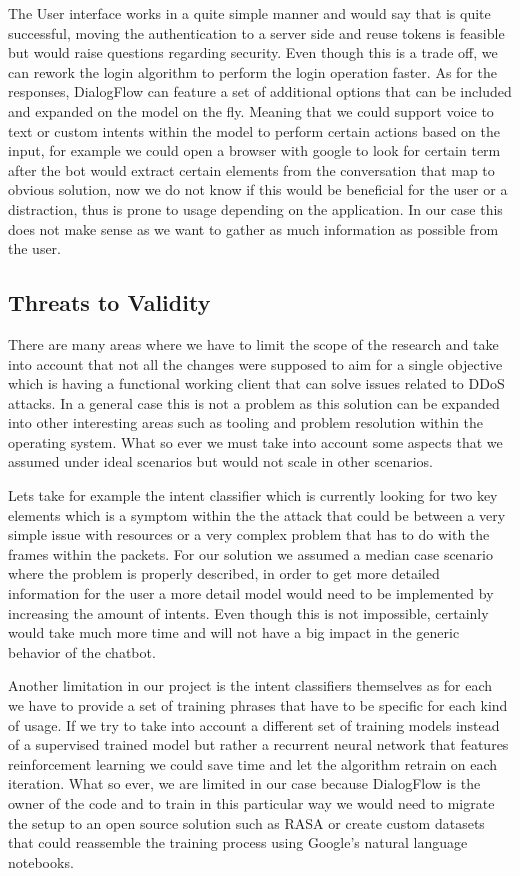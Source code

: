 The User interface works in a quite simple manner and would say that is quite successful, moving the authentication to a server side and reuse tokens is feasible but would raise questions regarding security. Even though this is a trade off, we can rework the login algorithm to perform the login operation faster. As for the responses, DialogFlow can feature a set of additional options that can be included and expanded on the model on the fly. Meaning that we could support voice to text or custom intents within the model to perform certain actions based on the input, for example we could open a browser with google to look for certain term after the bot would extract certain elements from the conversation that map to obvious solution, now we do not know if this would be beneficial for the user or a distraction, thus is prone to usage depending on the application. In our case this does not make sense as we want to gather as much information as possible from the user.

\subsection{Threats to Validity}

There are many areas where we have to limit the scope of the research and take into account that not all the changes were supposed to aim for a single objective which is having a functional working client that can solve issues related to DDoS attacks. In a general case this is not a problem as this solution can be expanded into other interesting areas such as tooling and problem resolution within the operating system. What so ever we must take into account some aspects that we assumed under ideal scenarios but would not scale in other scenarios. 

Lets take for example the intent classifier which is currently looking for two key elements which is a symptom within the the attack that could be between a very simple issue with resources or a very complex problem that has to do with the frames within the packets. For our solution we assumed a median case scenario where the problem is properly described, in order to get more detailed information for the user a more detail model would need to be implemented by increasing the amount of intents. Even though this is not impossible, certainly would take much more time and will not have a big impact in the generic behavior of the chatbot.

Another limitation in our project is the intent classifiers themselves as for each we have to provide a set of training phrases that have to be specific for each kind of usage. If we try to take into account a different set of training models instead of a supervised trained model but rather a recurrent neural network that features reinforcement learning we could save time and let the algorithm retrain on each iteration. What so ever, we are limited in our case because DialogFlow is the owner of the code and to train in this particular way we would need to migrate the setup to an open source solution such as RASA or create custom datasets that could reassemble the training process using Google's natural language notebooks.

